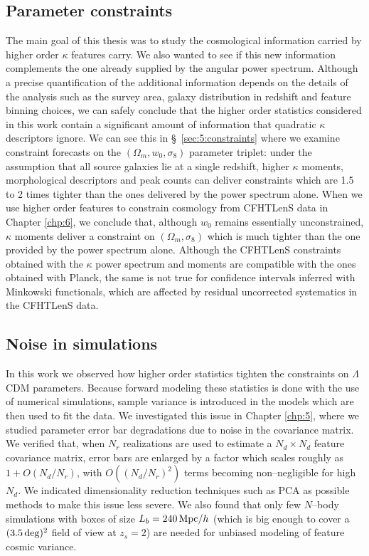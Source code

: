 \subsection{Parameter constraints}
The main goal of this thesis was to study the cosmological information carried by higher order $\kappa$ features carry. We also wanted to see if this new information complements the one already supplied by the angular power spectrum. Although a precise quantification of the additional information depends on the details of the analysis such as the survey area, galaxy distribution in redshift and feature binning choices, we can safely conclude that the higher order statistics considered in this work contain a significant amount of information that quadratic $\kappa$ descriptors ignore. We can see this in \S~\ref{sec:5:constraints} where we examine constraint forecasts on the $(\Omega_m,w_0,\sigma_8)$ parameter triplet: under the assumption that all source galaxies lie at a single redshift, higher $\kappa$ moments, morphological descriptors and peak counts can deliver constraints which are 1.5 to 2 times tighter than the ones delivered by the power spectrum alone. When we use higher order features to constrain cosmology from CFHTLenS data in Chapter \ref{chp:6}, we conclude that, although $w_0$ remains essentially unconstrained, $\kappa$ moments deliver a constraint on $(\Omega_m,\sigma_8)$ which is much tighter than the one provided by the power spectrum alone. Although the CFHTLenS constraints obtained with the $\kappa$ power spectrum and moments are compatible with the ones obtained with Planck, the same is not true for confidence intervals inferred with Minkowski functionals, which are affected by residual uncorrected systematics in the CFHTLenS data. 

\subsection{Noise in simulations}
In this work we observed how higher order statistics tighten the constraints on $\Lambda$CDM parameters. Because forward modeling these statistics is done with the use of numerical simulations, sample variance is introduced in the models which are then used to fit the data. We investigated this issue in Chapter \ref{chp:5}, where we studied parameter error bar degradations due to noise in the covariance matrix. We verified that, when $N_r$ realizations are used to estimate a $N_d\times N_d$ feature covariance matrix, error bars are enlarged by a factor which scales roughly as  $1+O(N_d/N_r)$, with $O((N_d/N_r)^2)$ terms becoming non--negligible for high $N_d$. We indicated dimensionality reduction techniques such as PCA as possible methods to make this issue less severe. We also found that only few $N$--body simulations with boxes of size $L_b=240\,{\rm Mpc}/h$ (which is big enough to cover a $(3.5\,{\rm deg})^2$ field of view at $z_s=2$) are needed for unbiased modeling of feature cosmic variance.  

